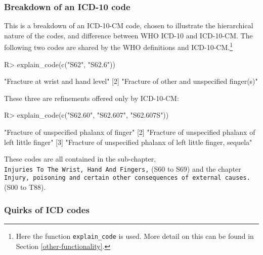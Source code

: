 \documentclass[article]{jss}
\begin{document}
\hypertarget{breakdown-of-an-icd-10-code}{%
\subsubsection{Breakdown of an ICD-10
code}\label{breakdown-of-an-icd-10-code}}

This is a breakdown of an ICD-10-CM code, chosen to illustrate the
hierarchical nature of the codes, and difference between WHO ICD-10 and
ICD-10-CM. The following two codes are shared by the WHO definitions and
ICD-10-CM.\footnote{Here the  function \texttt{explain\_code}
  is used. More detail on this can be found in Section
  \ref{other-functionality}.}

\begin{CodeChunk}

\begin{CodeInput}
R> explain_code(c("S62", "S62.6"))
\end{CodeInput}

\begin{CodeOutput}
[1] "Fracture at wrist and hand level"           
[2] "Fracture of other and unspecified finger(s)"
\end{CodeOutput}
\end{CodeChunk}

These three are refinements offered only by ICD-10-CM:

\begin{CodeChunk}

\begin{CodeInput}
R> explain_code(c("S62.60", "S62.607", "S62.607S"))
\end{CodeInput}

\begin{CodeOutput}
[1] "Fracture of unspecified phalanx of finger"                     
[2] "Fracture of unspecified phalanx of left little finger"         
[3] "Fracture of unspecified phalanx of left little finger, sequela"
\end{CodeOutput}
\end{CodeChunk}

These codes are all contained in the sub-chapter,
\texttt{Injuries\ To\ The\ Wrist,\ Hand\ And\ Fingers,} (S60 to S69) and
the chapter
\texttt{Injury,\ poisoning\ and\ certain\ other\ consequences\ of\ external\ causes.}
(S00 to T88).

\hypertarget{quirks-of-icd-codes}{%
\subsubsection{Quirks of ICD codes}\label{quirks-of-icd-codes}}
\end{document}
